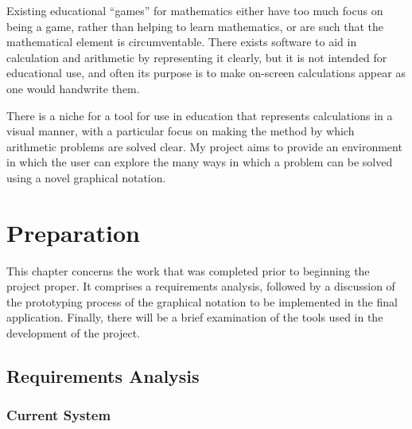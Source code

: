 \documentclass[12pt,twoside,notitlepage,xetex]{report}
\begin{document}
Existing educational ``games'' for mathematics either have too much focus on
being a game, rather than helping to learn mathematics, or are such that the
mathematical element is circumventable.  There exists software to aid in
calculation and arithmetic by representing it clearly, but it is not intended
for educational use, and often its purpose is to make on-screen calculations
appear as one would handwrite them.

There is a niche for a tool for use in education that represents calculations in
a visual manner, with a particular focus on making the method by which arithmetic
problems are solved clear.  My project aims to provide an environment in which
the user can explore the many ways in which a problem can be solved using a
novel graphical notation.

\cleardoublepage



\chapter{Preparation}

This chapter concerns the work that was completed prior to beginning the
project proper.  It comprises a requirements analysis, followed by a discussion
of the prototyping process of the graphical notation to be implemented in the
final application.  Finally, there will be a brief examination of the tools
used in the development of the project.

\section{Requirements Analysis}


\subsection{Current System}
\end{document}
